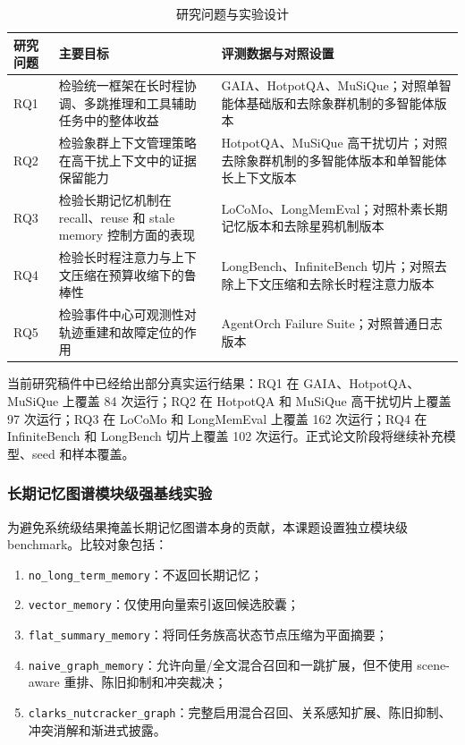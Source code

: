 \documentclass[UTF8,a4paper,zihao=-4,fontset=windows]{ctexart}
\begin{document}
\begin{longtable}{>{\raggedright\arraybackslash}p{}>{\raggedright\arraybackslash}p{}>{\raggedright\arraybackslash}p{}}
  \caption{研究问题与实验设计}\\
  \toprule
  研究问题 & 主要目标 & 评测数据与对照设置\\
  \midrule
  RQ1 & 检验统一框架在长时程协调、多跳推理和工具辅助任务中的整体收益 & GAIA、HotpotQA、MuSiQue；对照单智能体基础版和去除象群机制的多智能体版本\\
  RQ2 & 检验象群上下文管理策略在高干扰上下文中的证据保留能力 & HotpotQA、MuSiQue 高干扰切片；对照去除象群机制的多智能体版本和单智能体长上下文版本\\
  RQ3 & 检验长期记忆机制在 recall、reuse 和 stale memory 控制方面的表现 & LoCoMo、LongMemEval；对照朴素长期记忆版本和去除星鸦机制版本\\
  RQ4 & 检验长时程注意力与上下文压缩在预算收缩下的鲁棒性 & LongBench、InfiniteBench 切片；对照去除上下文压缩和去除长时程注意力版本\\
  RQ5 & 检验事件中心可观测性对轨迹重建和故障定位的作用 & AgentOrch Failure Suite；对照普通日志版本\\
  \bottomrule
\end{longtable}

当前研究稿件中已经给出部分真实运行结果：RQ1 在 GAIA、HotpotQA、MuSiQue 上覆盖 84 次运行；RQ2 在 HotpotQA 和 MuSiQue 高干扰切片上覆盖 97 次运行；RQ3 在 LoCoMo 和 LongMemEval 上覆盖 162 次运行；RQ4 在 InfiniteBench 和 LongBench 切片上覆盖 102 次运行。正式论文阶段将继续补充模型、seed 和样本覆盖。

\subsubsection{长期记忆图谱模块级强基线实验}

为避免系统级结果掩盖长期记忆图谱本身的贡献，本课题设置独立模块级 benchmark。比较对象包括：

\begin{enumerate}[label=\arabic*.]
  \item \texttt{no\_long\_term\_memory}：不返回长期记忆；
  \item \texttt{vector\_memory}：仅使用向量索引返回候选胶囊；
  \item \texttt{flat\_summary\_memory}：将同任务族高状态节点压缩为平面摘要；
  \item \texttt{naive\_graph\_memory}：允许向量/全文混合召回和一跳扩展，但不使用 scene-aware 重排、陈旧抑制和冲突裁决；
  \item \texttt{clarks\_nutcracker\_graph}：完整启用混合召回、关系感知扩展、陈旧抑制、冲突消解和渐进式披露。
\end{enumerate}
\end{document}
